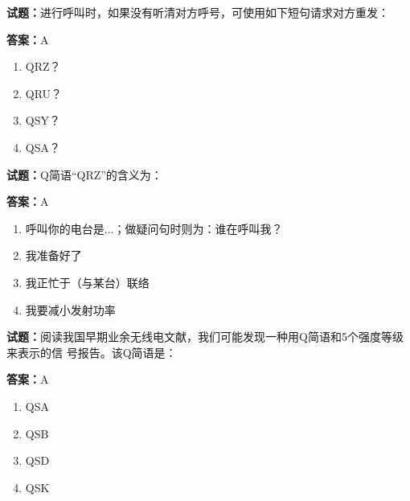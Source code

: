 \documentclass{ctexbook}
\begin{document}




\vspace{1em}

\textbf{试题：}进行呼叫时，如果没有听清对方呼号，可使用如下短句请求对方重发： 

\textbf{答案：}A 

\begin{enumerate}[leftmargin=3em]
  \item QRZ？ 

  \item QRU？ 

  \item QSY？ 

  \item QSA？ 

\end{enumerate}





\vspace{1em}

\textbf{试题：}Q简语“QRZ”的含义为： 

\textbf{答案：}A 


\begin{enumerate}[leftmargin=3em]
  \item 呼叫你的电台是...；做疑问句时则为：谁在呼叫我？ 

  \item 我准备好了 

  \item 我正忙于（与某台）联络 

  \item 我要减小发射功率 

\end{enumerate}





\vspace{1em}

\textbf{试题：}阅读我国早期业余无线电文献，我们可能发现一种用Q简语和5个强度等级来表示的信
号报告。该Q简语是： 

\textbf{答案：}A 

\begin{enumerate}[leftmargin=3em]
  \item QSA 

  \item QSB 

  \item QSD 

  \item QSK 

\end{enumerate}
\end{document}
